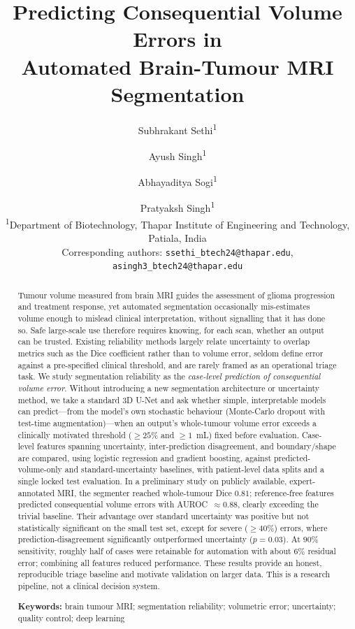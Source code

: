 \documentclass[11pt]{article}
\title{\textbf{Predicting Consequential Volume Errors in\\ Automated Brain-Tumour MRI Segmentation}}
\author{
  Subhrakant Sethi\textsuperscript{1} \and Ayush Singh\textsuperscript{1} \and
  Abhayaditya Sogi\textsuperscript{1} \and Pratyaksh Singh\textsuperscript{1}\\[2pt]
  \small \textsuperscript{1}Department of Biotechnology, Thapar Institute of
  Engineering and Technology, Patiala, India\\
  \small Corresponding authors: \texttt{ssethi\_btech24@thapar.edu},
  \texttt{asingh3\_btech24@thapar.edu}
}
\date{}
\begin{document}
\maketitle

\begin{abstract}
\noindent
Tumour volume measured from brain MRI guides the assessment of glioma progression
and treatment response, yet automated segmentation occasionally mis-estimates
volume enough to mislead clinical interpretation, without signalling that it has
done so. Safe large-scale use therefore requires knowing, for each scan, whether an
output can be trusted. Existing reliability methods largely relate uncertainty to
overlap metrics such as the Dice coefficient rather than to volume error, seldom
define error against a pre-specified clinical threshold, and are rarely framed as an
operational triage task. We study segmentation reliability as the \emph{case-level
prediction of consequential volume error}. Without introducing a new segmentation
architecture or uncertainty method, we take a standard 3D U-Net and ask whether
simple, interpretable models can predict---from the model's own stochastic behaviour
(Monte-Carlo dropout with test-time augmentation)---when an output's whole-tumour
volume error exceeds a clinically motivated threshold ($\geq 25\%$ and $\geq 1$~mL)
fixed before evaluation. Case-level features spanning uncertainty, inter-prediction
disagreement, and boundary/shape are compared, using logistic regression and
gradient boosting, against predicted-volume-only and standard-uncertainty baselines,
with patient-level data splits and a single locked test evaluation. In a preliminary
study on publicly available, expert-annotated MRI, the segmenter reached whole-tumour
Dice $0.81$; reference-free features predicted consequential volume errors with
AUROC~$\approx 0.88$, clearly exceeding the trivial baseline. Their advantage over
standard uncertainty was positive but not statistically significant on the small test
set, except for severe ($\geq 40\%$) errors, where prediction-disagreement
significantly outperformed uncertainty ($p=0.03$). At $90\%$ sensitivity, roughly half
of cases were retainable for automation with about $6\%$ residual error; combining all
features reduced performance. These results provide an honest, reproducible triage
baseline and motivate validation on larger data. This is a research pipeline, not a
clinical decision system.

\vspace{4pt}
\noindent\textbf{Keywords:} brain tumour MRI; segmentation reliability; volumetric
error; uncertainty; quality control; deep learning
\end{abstract}
\end{document}
